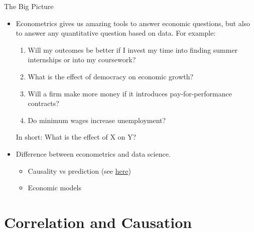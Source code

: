 \documentclass[11pt]{beamer}
\begin{document}
\begin{frame}{The Big Picture}
\begin{itemize}
\item Econometrics gives us amazing tools to answer economic questions, but also to answer any quantitative question based on data.
For example:
\begin{enumerate}
\item Will my outcomes be better if I invest my time into finding summer internships or into my coursework?
\item What is the effect of democracy on economic growth?
\item Will a firm make more money if it introduces pay-for-performance contracts?
\item Do minimum wages increase unemployment?
\end{enumerate}
In short: What is the effect of X on Y? \\
    \item Difference between econometrics and data science.
        \begin{itemize}
        \item Causality vs prediction (see \href{https://www.frontiersin.org/journals/bioengineering-and-biotechnology/articles/10.3389/fbioe.2016.00056/full}{here})
        \item Economic models
        \end{itemize}
\end{itemize}
\end{frame}





\section{Correlation and Causation}
\end{document}
